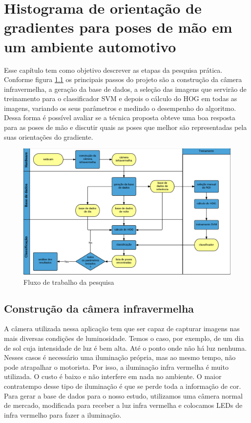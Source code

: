 \chapter{Histograma de orientação de gradientes para poses de mão em um ambiente automotivo}

Esse capítulo tem como objetivo descrever as etapas da pesquisa prática. Conforme figura \ref{fig:research_steps} os principais passos do projeto são a construção da câmera infravermelha, a geração da base de dados, a seleção das imagens que servirão de treinamento para o classificador SVM e depois o cálculo do HOG em todas as imagens, variando os seus parâmetros e medindo o desempenho do algoritmo. Dessa forma é possível avaliar se a técnica proposta obteve uma boa resposta para as poses de mão e discutir quais as poses que melhor são representadas pela suas orientações do gradiente.

\begin{figure}[ht!]
	\centering
  	\includegraphics[scale=0.3]{image/HOG.png}
  	\caption{Fluxo de trabalho da pesquisa}
  	\label{fig:research_steps}
\end{figure}

\section{Construção da câmera infravermelha}

A câmera utilizada nessa aplicação tem que ser capaz de capturar imagens nas mais diversas condições de luminosidade. Temos o caso, por exemplo, de um dia de sol cuja intensidade de luz é bem alta. Até o ponto onde não há luz nenhuma.
Nesses casos é necessário uma iluminação própria, mas ao mesmo tempo, não pode atrapalhar o motorista. Por isso, a iluminação infra vermelha é muito utilizada. O custo é baixo e não interfere em nada no ambiente. O maior contratempo desse tipo de iluminação é que se perde toda a informação de cor.
Para gerar a base de dados para o nosso estudo, utilizamos uma câmera normal de mercado, modificada para receber a luz infra vermelha e colocamos LEDs de infra vermelho para fazer a iluminação.

